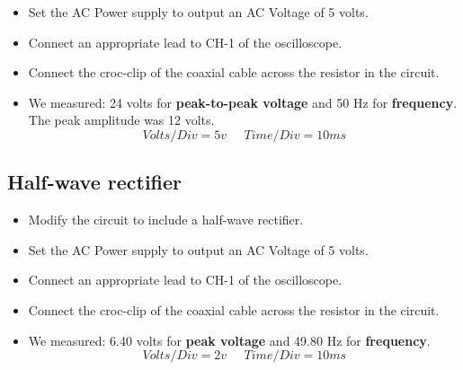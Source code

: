 \documentclass[a4paper]{article}
\begin{document}
\begin{itemize}
    \item Set the AC Power supply to output an AC Voltage of 5 volts.
    \item Connect an appropriate lead to CH-1 of the oscilloscope.
    \item Connect the croc-clip of the coaxial cable across the resistor in the circuit.
    \item We measured: 24 volts for \textbf{peak-to-peak voltage} and 50 Hz for \textbf{frequency}. The peak amplitude was 12 volts.
    \[Volts/Div = 5v \; \; \; \; \; Time/Div = 10ms\]
\end{itemize}

\begin{figure}[H]
    \centering
\end{figure}

\subsection{Half-wave rectifier}

\begin{itemize}
    \item Modify the circuit to include a half-wave rectifier.
    \item Set the AC Power supply to output an AC Voltage of 5 volts.
    \item Connect an appropriate lead to CH-1 of the oscilloscope.
    \item Connect the croc-clip of the coaxial cable across the resistor in the circuit.
    \item We measured: 6.40 volts for \textbf{peak voltage} and 49.80 Hz for \textbf{frequency}.
    \[Volts/Div = 2v \; \; \; \; \; Time/Div = 10ms\]
\end{itemize}
\end{document}
